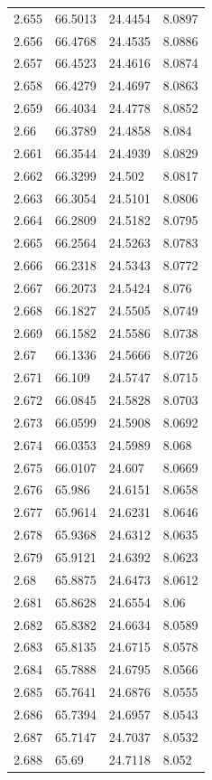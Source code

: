 \begin{tabular}{llll}
2.655 & 66.5013 & 24.4454 & 8.0897 \\
2.656 & 66.4768 & 24.4535 & 8.0886 \\
2.657 & 66.4523 & 24.4616 & 8.0874 \\
2.658 & 66.4279 & 24.4697 & 8.0863 \\
2.659 & 66.4034 & 24.4778 & 8.0852 \\
2.66 & 66.3789 & 24.4858 & 8.084 \\
2.661 & 66.3544 & 24.4939 & 8.0829 \\
2.662 & 66.3299 & 24.502 & 8.0817 \\
2.663 & 66.3054 & 24.5101 & 8.0806 \\
2.664 & 66.2809 & 24.5182 & 8.0795 \\
2.665 & 66.2564 & 24.5263 & 8.0783 \\
2.666 & 66.2318 & 24.5343 & 8.0772 \\
2.667 & 66.2073 & 24.5424 & 8.076 \\
2.668 & 66.1827 & 24.5505 & 8.0749 \\
2.669 & 66.1582 & 24.5586 & 8.0738 \\
2.67 & 66.1336 & 24.5666 & 8.0726 \\
2.671 & 66.109 & 24.5747 & 8.0715 \\
2.672 & 66.0845 & 24.5828 & 8.0703 \\
2.673 & 66.0599 & 24.5908 & 8.0692 \\
2.674 & 66.0353 & 24.5989 & 8.068 \\
2.675 & 66.0107 & 24.607 & 8.0669 \\
2.676 & 65.986 & 24.6151 & 8.0658 \\
2.677 & 65.9614 & 24.6231 & 8.0646 \\
2.678 & 65.9368 & 24.6312 & 8.0635 \\
2.679 & 65.9121 & 24.6392 & 8.0623 \\
2.68 & 65.8875 & 24.6473 & 8.0612 \\
2.681 & 65.8628 & 24.6554 & 8.06 \\
2.682 & 65.8382 & 24.6634 & 8.0589 \\
2.683 & 65.8135 & 24.6715 & 8.0578 \\
2.684 & 65.7888 & 24.6795 & 8.0566 \\
2.685 & 65.7641 & 24.6876 & 8.0555 \\
2.686 & 65.7394 & 24.6957 & 8.0543 \\
2.687 & 65.7147 & 24.7037 & 8.0532 \\
2.688 & 65.69 & 24.7118 & 8.052 \\

\end{tabular}
